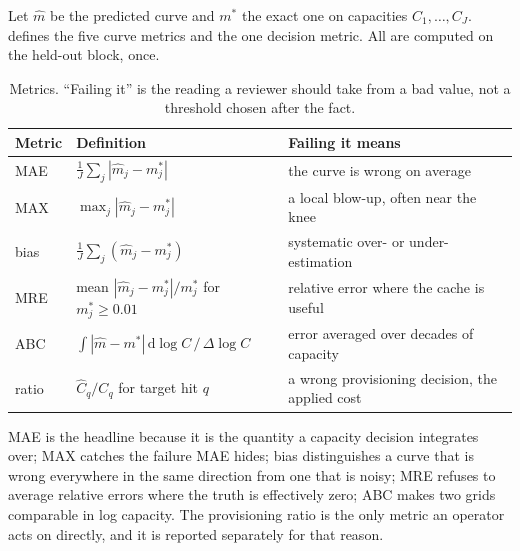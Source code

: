Let $\hat m$ be the predicted curve and $m^\ast$ the exact one on capacities
$C_1,\dots,C_J$.  defines the five curve metrics and the one
decision metric. All are computed on the held-out block, once.

\begin{table}[t]
\centering
\footnotesize
\caption{Metrics. ``Failing it'' is the reading a reviewer should take from a bad
value, not a threshold chosen after the fact.}
\label{tab:metrics}
\begin{tabular}{@{}l l l@{}}
\toprule
Metric & Definition & Failing it means \\
\midrule
MAE & $\frac1J\sum_j|\hat m_j-m^\ast_j|$ & the curve is wrong on average \\
MAX & $\max_j|\hat m_j-m^\ast_j|$ & a local blow-up, often near the knee \\
bias & $\frac1J\sum_j(\hat m_j-m^\ast_j)$ & systematic over- or under-estimation \\
MRE & mean $|\hat m_j-m^\ast_j|/m^\ast_j$ for $m^\ast_j\ge0.01$ & relative error where the cache is useful \\
ABC & $\int|\hat m-m^\ast|\,\mathrm{d}\log C \,/\,\Delta\log C$ & error averaged over decades of capacity \\
ratio & $\hat C_q/C_q$ for target hit $q$ & a wrong provisioning decision, the applied cost \\
\bottomrule
\end{tabular}
\end{table}

MAE is the headline because it is the quantity a capacity decision integrates over;
MAX catches the failure MAE hides; bias distinguishes a curve that is wrong
everywhere in the same direction from one that is noisy; MRE refuses to average
relative errors where the truth is effectively zero; ABC makes two grids comparable
in log capacity. The provisioning ratio is the only metric an operator acts on
directly, and it is reported separately for that reason.
